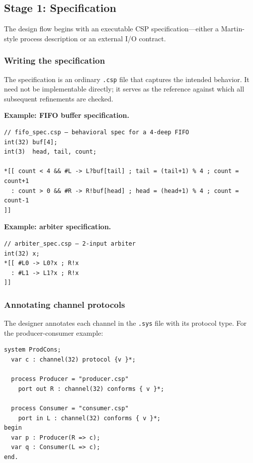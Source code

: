 \documentclass[11pt]{article}
\begin{document}
\subsection{Stage 1: Specification}
\label{sec:stage1}

The design flow begins with an executable CSP specification---either a
Martin-style process description or an external I/O contract.

\subsubsection{Writing the specification}

The specification is an ordinary \texttt{.csp} file that captures the
intended behavior.  It need not be implementable directly; it serves
as the reference against which all subsequent refinements are checked.

\textbf{Example: FIFO buffer specification.}

\begin{Verbatim}[samepage=true]
// fifo_spec.csp — behavioral spec for a 4-deep FIFO
int(32) buf[4];
int(3)  head, tail, count;

*[[ count < 4 && #L -> L?buf[tail] ; tail = (tail+1) % 4 ; count = count+1
  : count > 0 && #R -> R!buf[head] ; head = (head+1) % 4 ; count = count-1
]]
\end{Verbatim}

\textbf{Example: arbiter specification.}

\begin{Verbatim}[samepage=true]
// arbiter_spec.csp — 2-input arbiter
int(32) x;
*[[ #L0 -> L0?x ; R!x
  : #L1 -> L1?x ; R!x
]]
\end{Verbatim}

\subsubsection{Annotating channel protocols}

The designer annotates each channel in the \texttt{.sys} file with its
protocol type.  For the producer-consumer example:

\begin{Verbatim}[samepage=true]
system ProdCons;
  var c : channel(32) protocol {v }*;

  process Producer = "producer.csp"
    port out R : channel(32) conforms { v }*;

  process Consumer = "consumer.csp"
    port in L : channel(32) conforms { v }*;
begin
  var p : Producer(R => c);
  var q : Consumer(L => c);
end.
\end{Verbatim}
\end{document}
